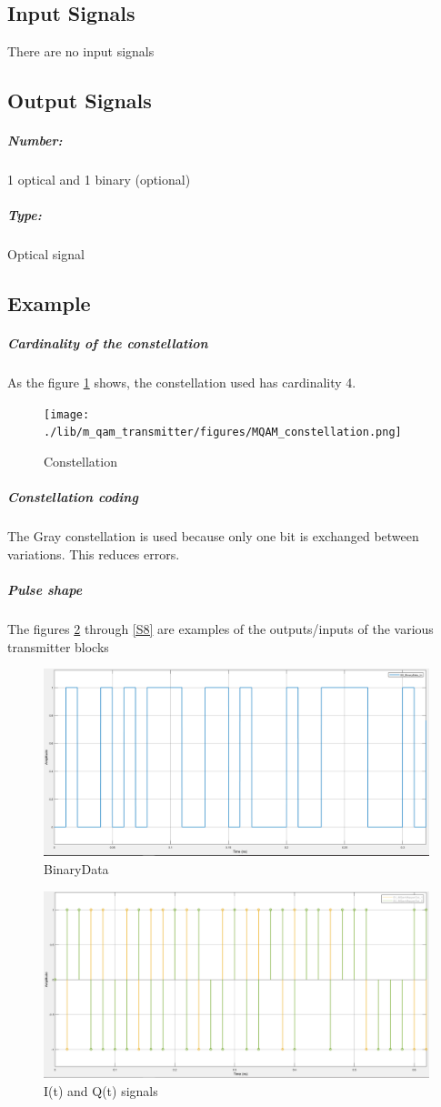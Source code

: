 \subsection*{Input Signals}
There are no input signals

\subsection*{Output Signals}

\subparagraph*{Number:} 1 optical and 1 binary (optional)

\subparagraph*{Type:} Optical signal

\subsection*{Example}
\subparagraph*{Cardinality of the constellation}
As the figure \ref{constellation} shows, the constellation used has cardinality 4.

\begin{figure}[hbtp]
\centering
\texttt{[image: ./lib/m\_qam\_transmitter/figures/MQAM\_constellation.png]}
\caption{Constellation}\label{constellation}
\end{figure}

\subparagraph*{Constellation coding}
The Gray constellation is used because only one bit is exchanged between variations. This reduces errors.
\subparagraph*{Pulse shape}
The figures \ref{S0} through \ref{S8} are examples of the outputs/inputs of the various transmitter blocks
\begin{figure}[H]
\centering
\includegraphics[scale=0.35]{./lib/m_qam_transmitter/figures/S0.PNG}
\caption{BinaryData}\label{S0}
\end{figure}

\begin{figure}[H]
\centering
\includegraphics[scale=0.35]{./lib/m_qam_transmitter/figures/S1_S2.PNG}
\caption{I(t) and Q(t) signals}\label{S1_S2}
\end{figure}

